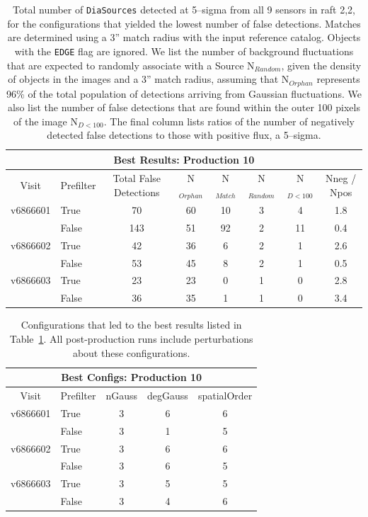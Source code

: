 \documentclass[prd, nofootinbib, floatfix, 11pt,tightenlines,times]{article}
\begin{document}
\clearpage
\begin{table}
\centering
\begin{tabular}{clcccccc}
\hline
\multicolumn{8}{|c|}{Best Results: Production 10} \\
\hline
Visit    & Prefilter & Total False Detections &  N$_{Orphan}$ & N$_{Match}$ & N$_{Random}$ & N$_{D<100}$ & Nneg / Npos \\
\hline
v6866601 & True      & 70      &60         & 10 & 3     & 4   & 1.8 \\ 
         & False     & 143     &51         & 92 & 2     & 11  & 0.4 \\
v6866602 & True      & 42      &36         & 6  & 2     & 1   & 2.6 \\
         & False     & 53      &45         & 8  & 2     & 1   & 0.5 \\
v6866603 & True      & 23      &23         & 0  & 1     & 0   & 2.8 \\
         & False     & 36      &35         & 1  & 1     & 0   & 3.4 \\
\end{tabular}
\caption{Total number of {\tt DiaSources} detected at 5--sigma from
  all 9 sensors in raft 2,2, for the configurations that yielded the
  lowest number of false detections.  Matches are determined using a
  3'' match radius with the input reference catalog.  Objects with the
  {\tt EDGE} flag are ignored.  We list the number of background
  fluctuations that are expected to randomly associate with a Source
  N$_{Random}$, given the density of objects in the images and a 3''
  match radius, assuming that N$_{Orphan}$ represents 96\% of the
  total population of detections arriving from Gaussian fluctuations.
  We also list the number of false detections that are found within
  the outer 100 pixels of the image N$_{D<100}$.  The final column
  lists ratios of the number of negatively detected false detections
  to those with positive flux, a 5--sigma. \label{tab-bestfp10}}
\end{table}


\begin{table}
\centering
\begin{tabular}{clccc}
\hline
\multicolumn{5}{|c|}{Best Configs: Production 10} \\
\hline
Visit    & Prefilter & nGauss & degGauss & spatialOrder \\
\hline
v6866601 & True      & 3      & 6        & 6 \\
         & False     & 3      & 1        & 5 \\
v6866602 & True      & 3      & 6        & 6 \\
         & False     & 3      & 6        & 5 \\
v6866603 & True      & 3      & 5        & 5 \\
         & False     & 3      & 4        & 6 \\
\end{tabular}
\caption{Configurations that led to the best results listed in
  Table~\ref{tab-bestfp10}.  All post-production runs include
  perturbations about these configurations. \label{tab-bestconfig10}}
\end{table}
\end{document}
